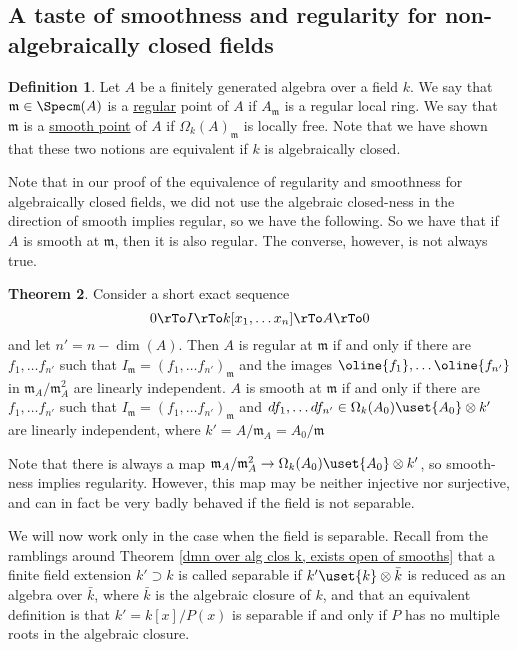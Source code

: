 \documentclass[12 pt]{article}
\theoremstyle{definition}
\newtheorem{thm}{Theorem}[section]
\newtheorem{defn}[thm]{Definition}
\renewcommand{\(}{\left(}
\renewcommand{\)}{\right)}
\newcommand\fm{{\mathfrak m}}
\begin{document}
\subsection{A taste of smoothness and regularity for non-algebraically closed fields}

\begin{defn} Let $A$ be a finitely generated algebra over a field $k$. We say that $\fm \in \Specm(A)$ is a \uline{regular} point of $A$ if $A_\fm$ is a regular local ring. We say that $\fm$ is a \uline{smooth point} of $A$ if $\Omega_k(A)_\fm$ is locally free. Note that we have shown that these two notions are equivalent if $k$ is algebraically closed.
\end{defn}

Note that in our proof of the equivalence of regularity and smoothness for algebraically closed fields, we did not use the algebraic closed-ness in the direction of smooth implies regular, so we have the following. So we have that if $A$ is smooth at $\fm$, then it is also regular. The converse, however, is not always true.



\begin{thm} Consider a short exact sequence
\[0 \rTo I \rTo k[x_1, \ldots x_n] \rTo A \rTo 0\]
and let $n'=n-\dim(A)$.
Then $A$ is regular at $\fm$ if and only if there are $f_1, \ldots f_{n'}$ such that $I_\fm=(f_1, \ldots f_{n'})_\fm$ and the images $\oline{f_1}, \ldots \oline{f_{n'}}$ in $\fm_{A}/\fm_{A}^2$ are linearly independent. $A$ is smooth at $\fm$ if and only if there are $f_1, \ldots f_{n'}$ such that $I_{\fm}=(f_1, \ldots f_{n'})_\fm$ and $df_1, \ldots df_{n'} \in \Omega_k(A_0) \uset{A_0} \otimes k'$ are linearly independent, where $k'=A/\fm_A=A_0/\fm$
\end{thm}

Note that there is always a map $\fm_A/\fm_A^2 \to \Omega_k(A_0) \uset{A_0}\otimes k'$, so smooth-ness implies regularity. However, this map may be neither injective nor surjective, and can in fact be very badly behaved if the field is not separable.

We will now work only in the case when the field is separable. Recall from the ramblings around Theorem \ref{dmn over alg clos k, exists open of smooths} that a finite field extension $k' \supset k$ is called separable if $k' \uset{k} \otimes \bar{k}$ is reduced as an algebra over $\bar{k}$, where $\bar{k}$ is the algebraic closure of $k$, and that an equivalent definition is that $k'=k[x]/P(x)$ is separable if and only if $P$ has no multiple roots in the algebraic closure.
\end{document}
